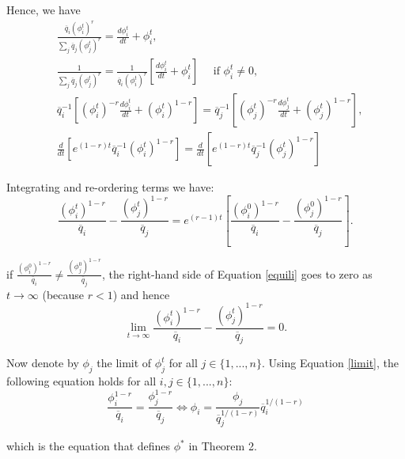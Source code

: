 {{\begin{frame}[c]
Hence, we have
\begin{align*}
&\frac{\overline{q}_i(\phi_i^t)^r}{\sum_j\overline{q}_j(\phi_j^t)^r}=\frac{d\phi_i^t}{d t}+\phi_i^t, \\
&\frac{1}{\sum_j\overline{q}_j(\phi_j^t)^r}=\frac{1}{\overline{q}_i(\phi_i^t)^r}[\frac{d\phi_i^t}{d t}+\phi_i^t] \quad \mbox{ if } \phi_i^t\neq 0,\\
&\overline{q}_i^{-1}[(\phi_i^t)^{-r}\frac{d\phi_i^t}{d t}+(\phi_i^t)^{1-r}]=\overline{q}_j^{-1}[(\phi_j^t)^{-r}\frac{d\phi_j^t}{d t}+(\phi_j^t)^{1-r}], \\
&\frac{d}{dt}\left[ e^{(1-r)t}\overline{q}_i^{-1}(\phi_i^t)^{1-r}\right]=\frac{d}{dt}\left[ e^{(1-r)t}\overline{q}_j^{-1}(\phi_j^t)^{1-r}\right]
\end{align*} 



\end{frame}
}




}\addtocounter{framenumber}{-1}
{
\begin{frame}[c]
Integrating and re-ordering  terms we have:
\begin{equation}
\label{equili}
\frac{(\phi_i^t)^{1-r}}{\overline{q}_i}-\frac{(\phi_j^t)^{1-r}}{\overline{q}_j}= e^{(r-1)t}\left[   \frac{(\phi_i^0)^{1-r}}{\overline{q}_i}-\frac{(\phi_j^0)^{1-r}}{\overline{q}_j} \right].
\end{equation}

if $\displaystyle
  \frac{(\phi_i^0)^{1-r}}{\overline{q}_i}\neq\frac{(\phi_j^0)^{1-r}}{\overline{q}_j}$,
  the right-hand side of Equation \eqref{equili} goes to zero as $t\to \infty$  (because
  $r<1$) and hence
\begin{equation}
\label{limit}
\lim_{t\to\infty} \frac{(\phi_i^t)^{1-r}}{\overline{q}_i}-\frac{(\phi_j^t)^{1-r}}{\overline{q}_j}=0. 
\end{equation}

Now denote by $\phi_j$ the limit of $\phi_j^t$ for all $j \in
\{1,...,n\}$. Using Equation \eqref{limit}, the following equation holds for all $i,j
\in\{1,...,n\}$:
\begin{equation}
\frac{\phi_{i}^{1-r}}{\overline{q}_i}=\frac{\phi_{j}^{1-r}}{\overline{q}_j} \Leftrightarrow \phi_{i}=\frac{\phi_{j}}{\overline{q}_j^{1/(1-r)}}\overline{q}_i^{1/(1-r)}
\end{equation}

which is the equation that defines $\phi^*$ in Theorem 2.

\end{frame}
}

